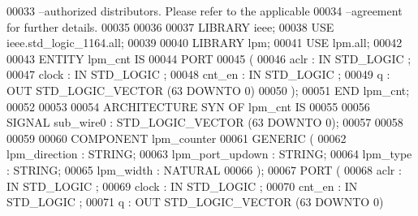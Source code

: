 \begin{DoxyCode}
{00033 \textcolor{keyword}{--authorized distributors.  Please refer to the applicable }
00034 \textcolor{keyword}{--agreement for further details.}
00035 
00036 
00037 \textcolor{vhdlkeyword}{LIBRARY }\textcolor{keywordflow}{ieee};
00038 \textcolor{vhdlkeyword}{USE }ieee.std\_logic\_1164.\textcolor{keywordflow}{all};
00039 
00040 \textcolor{vhdlkeyword}{LIBRARY }\textcolor{keywordflow}{lpm};
00041 \textcolor{vhdlkeyword}{USE }\textcolor{keywordflow}{lpm.all};
00042 
00043 \textcolor{keywordflow}{ENTITY }lpm_cnt \textcolor{keywordflow}{IS}
00044     \textcolor{keywordflow}{PORT}
00045     \textcolor{vhdlchar}{(}
00046         \textcolor{vhdlchar}{aclr}        \textcolor{vhdlchar}{:} \textcolor{keywordflow}{IN} \textcolor{comment}{STD\_LOGIC} ;
00047         \textcolor{vhdlchar}{clock}       \textcolor{vhdlchar}{:} \textcolor{keywordflow}{IN} \textcolor{comment}{STD\_LOGIC} ;
00048         \textcolor{vhdlchar}{cnt_en}      \textcolor{vhdlchar}{:} \textcolor{keywordflow}{IN} \textcolor{comment}{STD\_LOGIC} ;
00049         \textcolor{vhdlchar}{q}       \textcolor{vhdlchar}{:} \textcolor{keywordflow}{OUT} \textcolor{comment}{STD\_LOGIC\_VECTOR} \textcolor{vhdlchar}{(}\textcolor{vhdllogic}{}\textcolor{vhdllogic}{63} \textcolor{keywordflow}{DOWNTO} \textcolor{vhdllogic}{}\textcolor{vhdllogic}{0}\textcolor{vhdlchar}{)}
00050     \textcolor{vhdlchar}{)};
00051 \textcolor{keywordflow}{END} \textcolor{vhdlchar}{lpm\_cnt};
00052 
00053 
00054 \textcolor{keywordflow}{ARCHITECTURE} SYN \textcolor{keywordflow}{OF} lpm_cnt IS
00055 
00056     \textcolor{keywordflow}{SIGNAL} \textcolor{vhdlchar}{sub_wire0}    \textcolor{vhdlchar}{:} \textcolor{comment}{STD\_LOGIC\_VECTOR} \textcolor{vhdlchar}{(}\textcolor{vhdllogic}{}\textcolor{vhdllogic}{63} \textcolor{keywordflow}{DOWNTO} \textcolor{vhdllogic}{}\textcolor{vhdllogic}{0}\textcolor{vhdlchar}{)};
00057 
00058 
00059 
00060     \textcolor{keywordflow}{COMPONENT} lpm\_counter
00061     \textcolor{keywordflow}{GENERIC} (
00062         lpm\_direction       : \textcolor{comment}{STRING};
00063         lpm\_port\_updown     : \textcolor{comment}{STRING};
00064         lpm\_type        : \textcolor{comment}{STRING};
00065         lpm\_width       : \textcolor{comment}{NATURAL}
00066     );
00067     \textcolor{keywordflow}{PORT} (
00068             aclr    : \textcolor{keywordflow}{IN} \textcolor{comment}{STD\_LOGIC} ;
00069             clock   : \textcolor{keywordflow}{IN} \textcolor{comment}{STD\_LOGIC} ;
00070             cnt\_en  : \textcolor{keywordflow}{IN} \textcolor{comment}{STD\_LOGIC} ;
00071             q   : \textcolor{keywordflow}{OUT} \textcolor{comment}{STD\_LOGIC\_VECTOR} (\textcolor{vhdllogic}{}\textcolor{vhdllogic}{63} \textcolor{keywordflow}{DOWNTO} \textcolor{vhdllogic}{}\textcolor{vhdllogic}{0})
}
\end{DoxyCode}
